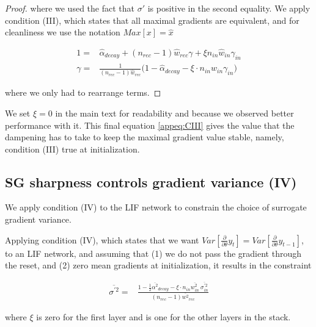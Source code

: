 \begin{proof}
\noindent where we used the fact that $\sigma'$ is positive in the second equality. We apply condition (III), which states that all maximal gradients are equivalent, and for cleanliness we use the notation $Max[x] = \hat{x}$



\begin{align}
    1 =& \hat{\alpha}_{decay}  +(n_{rec}-1) \hat{w}_{rec} \gamma + \xi n_{in}\hat{w}_{in} \gamma_{in}\\
    \gamma=&  
    \frac{1}{(n_{rec}-1)\hat{w}_{rec}}\Big( 1 -\hat{\alpha}_{decay} -\xi \cdot n_{in} \hat{w}_{in} \gamma_{in} \Big) \label{appeq:CIII}
\end{align}

\noindent where we only had to rearrange terms. 

\end{proof}

We set $\xi=0$ in the main text for readability and because we observed better performance with it.
This final equation \ref{appeq:CIII} gives the value that the dampening has to take to keep the maximal gradient value stable, namely, condition (III) true at initialization.


\subsection{SG sharpness controls gradient variance (IV)}

\label{app:backward}

We apply condition (IV) to the LIF network to constrain the choice of surrogate gradient variance. 


\begin{lemma}\label{thm:cIV}
Applying condition (IV), which states that we want $Var[\frac{\partial}{\partial \theta}y_t] = Var[\frac{\partial}{\partial \theta}y_{t-1}]$, to an LIF network, and assuming that (1) we do not pass the gradient through the reset, and (2) zero mean gradients at initialization, it results in the constraint  


\begin{align} \label{appeq:CIV}
    \overline{\sigma^{\prime 2}} =&  \frac{1-\frac{1}{2}\overline{\alpha^2}_{decay}-\xi \cdot n_{in}\overline{w_{in}^2}\ \overline{\sigma^{\prime 2}_{in}}}{(n_{rec}-1)\overline{w^2}_{rec} }  
\end{align}

\noindent where $\xi$ is zero for the first layer and is one for the other layers in the stack.

\end{lemma}



